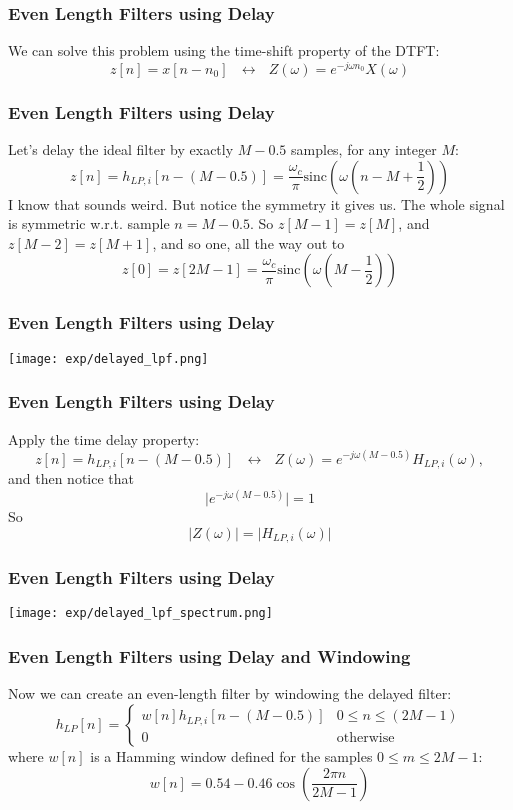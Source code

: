 \documentclass{beamer}
\begin{document}
\begin{frame}
  \frametitle{Even Length Filters using Delay}

  We can solve this problem using the time-shift property of the DTFT:
  \[
  z[n] = x[n-n_0]~~~\leftrightarrow~~~
  Z(\omega)=e^{-j\omega n_0}X(\omega)
  \]
\end{frame}
  
\begin{frame}
  \frametitle{Even Length Filters using Delay}

  Let's delay the ideal filter by exactly $M-0.5$ samples, for any
  integer $M$:
  \[
  z[n] = h_{LP,i}\left[n-(M-0.5)\right] =
  \frac{\omega_c}{\pi}\mbox{sinc}\left(\omega \left(n-M+\frac{1}{2}\right)\right)
  \]
  I know that sounds weird.  But notice the symmetry it gives us.  The whole signal is symmetric
  w.r.t. sample $n=M-0.5$.  So $z[M-1]=z[M]$, and $z[M-2]=z[M+1]$, and so one, all the way out to
  \begin{displaymath}
    z[0] = z[2M-1] =
    \frac{\omega_c}{\pi}\mbox{sinc}\left(\omega \left(M-\frac{1}{2}\right)\right)
  \end{displaymath}
\end{frame}

\begin{frame}
  \frametitle{Even Length Filters using Delay}
  
  \centerline{\texttt{[image: exp/delayed\_lpf.png]}}
\end{frame}
  
\begin{frame}
  \frametitle{Even Length Filters using Delay}

  Apply the time delay property:
  \[
  z[n] = h_{LP,i}\left[n-(M-0.5)\right]
  ~~~\leftrightarrow~~~
  Z(\omega)=e^{-j\omega (M-0.5)}H_{LP,i}(\omega),
  \]
  and then notice that
  \[
  \vert e^{-j\omega (M-0.5)}\vert = 1
  \]
  So
  \[
  \vert Z(\omega)\vert =\vert H_{LP,i}(\omega)\vert
  \]
\end{frame}

\begin{frame}
  \frametitle{Even Length Filters using Delay}
  
  \centerline{\texttt{[image: exp/delayed\_lpf\_spectrum.png]}}
\end{frame}

\begin{frame}
  \frametitle{Even Length Filters using Delay and Windowing}

  Now we can create an even-length filter by windowing the delayed filter:
  \[
  h_{LP}[n] = \begin{cases}
    w[n]h_{LP,i}\left[n-(M-0.5)\right] & 0\le n\le (2M-1)\\
    0 &\mbox{otherwise}
  \end{cases}
  \]
  where $w[n]$ is a Hamming window defined for the samples $0\le m\le 2M-1$:
  \[
  w[n] = 0.54 - 0.46 \cos\left(\frac{2\pi n}{2M-1}\right)
  \]
\end{frame}
\end{document}
